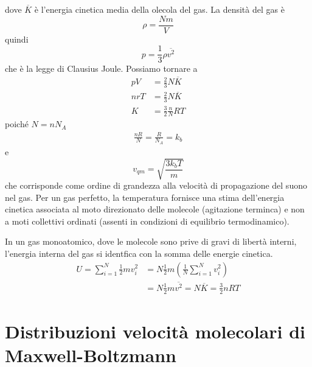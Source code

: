 \documentclass[a4paper]{article}
\begin{document}
dove \(\overline{K}\) è l'energia cinetica media della olecola del gas.
La densità del gas è
\[
    \rho = \frac{Nm}{V}
\]
quindi
\[
    p = \frac{1}{3}\rho \overline{v^2}
\]
che è la legge di Clausius Joule.
Possiamo tornare a
\begin{align*}
    pV &= \frac{2}{3} N \overline{K} \\
    nrT &= \frac{2}{3} N \overline{K} \\
    K &= \frac{3}{2} \frac{n}{N} RT
\end{align*}
poiché \(N = nN_A\)
\begin{align*}
    \frac{nR}{N} = \frac{R}{N_A} = k_b
\end{align*}
e
\[
    v_{qm} = \sqrt{\frac{3k_b T}{m}}
\]
che corrisponde come ordine di grandezza alla velocità di propagazione del suono nel gas.
Per un gas perfetto, la temperatura fornisce una stima dell'energia cinetica associata al moto
direzionato delle molecole (agitazione terminca) e non a moti collettivi ordinati (assenti in condizioni di equilibrio termodinamico).

In un gas monoatomico, dove le molecole sono prive di gravi di libertà interni, l'energia interna del gas
si identfica con la somma delle energie cinetica.
\begin{align*}
    U = \sum_{i=1}^N \frac{1}{2} mv_i^2 &= N\frac{1}{2}m\left(\frac{1}{N} \sum_{i=1}^N v_i^2\right) \\
    &= N \frac{1}{2}m\overline{v^2} = N\overline{K} = \frac{3}{2}nRT
\end{align*}


\section{Distribuzioni velocità molecolari di Maxwell-Boltzmann}
\end{document}

